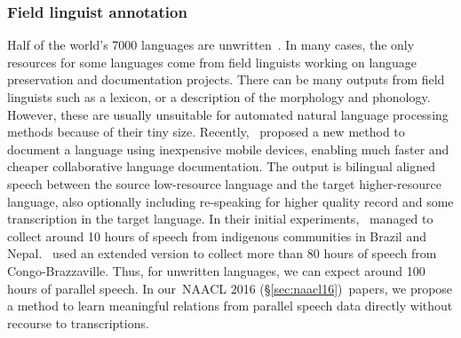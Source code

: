 \documentclass[12pt,twoside,final,hidelinks]{ltthesis}
\theoremstyle{definition}
\newcommand\naaclvi{NAACL 2016 (\S\ref{sec:naacl16})}
\begin{document}
\subsubsection{Field linguist annotation}
Half of the world's 7000 languages are unwritten~\cite{lewis2009}. In many cases, the only resources for some languages come from field 
linguists working on language preservation and documentation projects. There can 
be many outputs from field linguists such as a  
lexicon, or a description of the morphology and phonology. However, these are usually unsuitable for 
automated natural language processing methods because of their tiny size. 
Recently,~ proposed a new method to document a language using inexpensive mobile devices, enabling 
much faster and cheaper collaborative language documentation. The output is bilingual aligned speech between the source low-resource language and the 
target higher-resource language, also optionally including re-speaking for higher quality record and some 
transcription in the target language. In their initial experiments,~ managed to collect around 10 hours of speech from indigenous 
communities in Brazil and Nepal.~ used an extended version to collect more than 80 hours of speech from Congo-Brazzaville. Thus, for unwritten languages, we can expect around 100 hours of parallel speech. In our~\naaclvi\ papers, we propose a method to learn meaningful relations from parallel speech data directly without recourse to transcriptions. 
\end{document}
